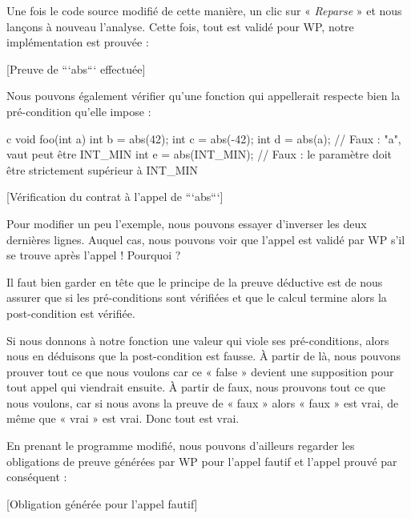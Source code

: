 \documentclass[middle]{zmdocument}
\begin{document}
Une fois le code source modifié de cette manière, un clic sur « \textit{Reparse} » et 
nous lançons à nouveau l'analyse. Cette fois, tout est validé pour WP, notre 
implémentation est prouvée :



[Preuve de ```abs``` effectuée]


Nous pouvons également vérifier qu'une fonction qui appellerait  
respecte bien la pré-condition qu'elle impose :



\begin{CodeBlock}{c}
void foo(int a){
   int b = abs(42);
   int c = abs(-42);
   int d = abs(a);       // Faux : "a", vaut peut être INT_MIN
   int e = abs(INT_MIN); // Faux : le paramètre doit être strictement supérieur à INT_MIN
}
\end{CodeBlock}



[Vérification du contrat à l'appel de ```abs```]


Pour modifier un peu l'exemple, nous pouvons essayer d'inverser les deux 
dernières lignes. Auquel cas, nous pouvons voir que l'appel 
est validé par WP s'il se trouve après l'appel  ! 
Pourquoi ?



Il faut bien garder en tête que le principe de la preuve déductive est de nous
assurer que si les pré-conditions sont vérifiées et que le calcul termine alors
la post-condition est vérifiée.



Si nous donnons à notre fonction une valeur qui viole ses pré-conditions, alors
nous en déduisons que la post-condition est fausse. À partir de là, nous pouvons 
prouver tout ce que nous voulons car ce « false » devient une supposition pour
tout appel qui viendrait ensuite. À partir de faux, nous prouvons tout ce que 
nous voulons, car si nous avons la preuve de « faux » alors « faux » est vrai, de 
même que « vrai » est vrai. Donc tout est vrai.



En prenant le programme modifié, nous pouvons d'ailleurs regarder les obligations
de preuve générées par WP pour l'appel fautif et l'appel prouvé par conséquent :



[Obligation générée pour l'appel fautif]
\end{document}
